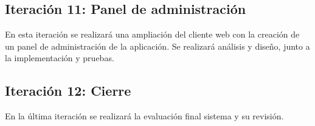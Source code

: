 \subsection{Iteración 11: Panel de administración}
En esta iteración se realizará una ampliación del cliente web con la creación de un panel de administración de la aplicación. Se realizará análisis y diseño, junto a la implementación y pruebas.


\subsection{Iteración 12: Cierre}
En la última iteración se realizará la evaluación final sistema y su revisión.





